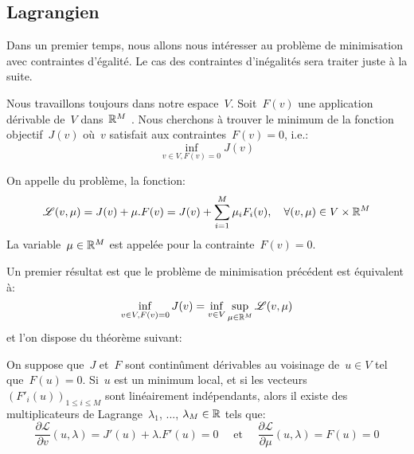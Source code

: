 \medskip
\subsection{Lagrangien}

Dans un premier temps, nous allons nous intéresser au problème de minimisation avec contraintes d'égalité. Le cas des contraintes d'inégalités sera traiter juste à la suite.

\medskip
\begin{definition}
Nous travaillons toujours dans notre espace~$V$.
Soit~$F(v)$ une application dérivable de~$V$ dans~$\mathbb R^M$ .
Nous cherchons à trouver le minimum de la fonction objectif~$J(v)$ où~$v$ satisfait aux contraintes~$F(v)=0$, i.e.:
\begin{equation}\label{Eq-LagEq}
\inf_{v\in V, F(v)=0} J(v)
\end{equation}

On appelle  du problème, la fonction:
\begin{equation}
\mathscr{L}(v,\mu) = J(v)+\mu.F(v) = J(v) + \displaystyle\sum_{i=1}^M \mu_iF_i(v), 
\quad \forall (v,\mu)\in V\times\mathbb R^M
\end{equation}
La variable~$\mu\in\mathbb R^M$ est appelée  pour la contrainte~$F(v)=0$.
\end{definition}

Un premier résultat est que le problème de minimisation précédent est équivalent à:
\begin{equation}
\inf_{v\in V, F(v)=0} J(v) = \inf_{v\in V} \sup_{\mu\in\mathbb R^M} \mathscr{L}(v,\mu)
\end{equation}
et l'on dispose du théorème suivant:
\begin{theoreme}
On suppose que~$J$ et~$F$ sont continûment dérivables au voisinage de~$u\in V$ tel que~$F(u)=0$. Si~$u$ est un minimum local, et si les vecteurs~$(F'_i(u))_{1\le i\le M}$ sont linéairement indépendants, alors il existe des multiplicateurs de Lagrange~$\lambda_1$, ..., $\lambda_M\in\mathbb R$ tels que:
\begin{equation}
\dfrac{\partial\mathscr{L}}{\partial v}(u,\lambda) = J'(u)+\lambda.F'(u)=0
\quad \text{ et }\quad
\dfrac{\partial\mathscr{L}}{\partial \mu}(u,\lambda) = F(u)=0
\end{equation}
\end{theoreme}

